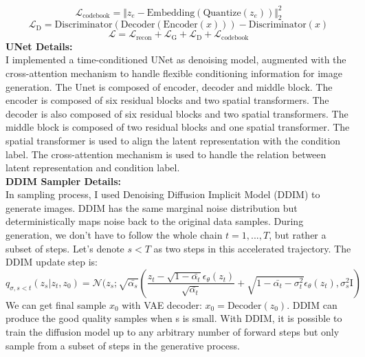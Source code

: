 \documentclass{article} %
\begin{document}
    \begin{equation}
        \mathcal{L}_{\text{codebook}} = \Vert z_e - \text{Embedding}(\text{Quantize}(z_e)) \Vert_2^2
    \end{equation}
    \begin{equation}
        \mathcal{L}_{\text{D}} = \text{Discriminator}(\text{Decoder}(\text{Encoder}(x))) - \text{Discriminator}(x) 
    \end{equation}
    \begin{equation}
        \mathcal{L} = \mathcal{L}_{\text{recon}} + \mathcal{L}_{\text{G}} + \mathcal{L}_{\text{D}} + \mathcal{L}_{\text{codebook}}
    \end{equation}
    \textbf{UNet Details:} \\
    I implemented a time-conditioned UNet as denoising model, augmented with the cross-attention mechanism to handle flexible conditioning information for image generation.
    The Unet is composed of encoder, decoder and middle block. The encoder is composed of six residual blocks and two spatial transformers. The decoder is also composed of six residual blocks and two spatial transformers. The middle block is composed of two residual blocks and one spatial transformer.
    The spatial transformer is used to align the latent representation with the condition label. The cross-attention mechanism is used to handle the relation between latent representation and condition label. \\
    \textbf{DDIM Sampler Details:} \\
    In sampling process, I used Denoising Diffusion Implicit Model (DDIM) to generate images.
    DDIM has the same marginal noise distribution but deterministically maps noise back to the original data samples.
    During generation, we don’t have to follow the whole chain $t = 1,...,T$, but rather a subset of steps. Let's denote $s < T$ as two steps in this accelerated trajectory. 
    The DDIM update step is:
    \begin{equation}
        q_{\sigma, s<t}(z_s|z_t, z_0) = \mathcal{N}(z_s; \sqrt{\bar{\alpha_{s}}}(\frac{z_t - \sqrt{1-\bar{\alpha_{t}}}\epsilon_{\theta}(z_t)}{\sqrt{\bar{\alpha_{t}}}} + \sqrt{1-\bar{\alpha_t}-\sigma_t^2}\epsilon_{\theta}(z_t), \sigma_s^2\text{I})
    \end{equation}
    We can get final sample $x_0$ with VAE decoder: $x_0 = \text{Decoder}(z_0)$.
    DDIM can produce the good quality samples when s is small. With DDIM, it is possible to train the diffusion model up to any arbitrary number of forward steps but only sample from a subset of steps in the generative process.
\end{document}
